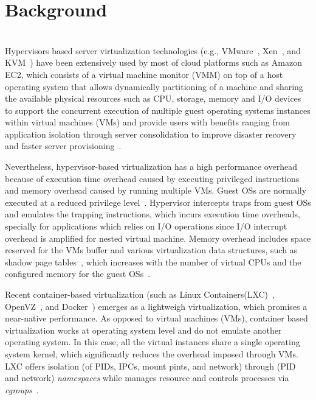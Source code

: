 
\section{Background}

\\

Hypervisors based server virtualization technologies (e.g., VMware~\cite{xxx}, Xen~\cite{xxx}, and KVM~\cite{xxx}) have been extensively used by most of cloud platforms such as Amazon EC2, which consists of a virtual machine monitor (VMM) on top of a host operating system that allows dynamically partitioning of a machine and sharing the available physical resources such as CPU, storage, memory and I/O devices to support the concurrent execution of multiple guest operating systems instances within virtual machines (VMs) and provide users with benefits ranging from application isolation through server consolidation to improve disaster recovery and faster server provisioning~\cite{xxx}.

Nevertheless, hypervisor-based virtualization has a high performance overhead because of execution time overhead caused by executing privileged instructions and memory overhead caused by running multiple VMs. Guest OSs are normally executed at a reduced privilege level~\cite{}. Hypervisor intercepts traps from guest OSs and emulates the trapping instructions, which incurs execution time overheads, specially for applications which relies on I/O operations since I/O interrupt overhead is amplified for nested virtual machine. Memory overhead includes space reserved for the VMs buffer and various virtualization data structures, such as shadow page tables~\cite{}, which increases with the number of virtual CPUs and the configured memory for the guest OSs~\cite{}. 

Recent container-based virtualization (such as Linux Containers(LXC)~\cite{xxx}, OpenVZ~\cite{bibid}, and Docker~\cite{}) emerges as a lightweigh virtualization, which promises a near-native performance. As opposed to virtual machines (VMs), container based virtualization works at operating system level and do not emulate another operating system. In this case, all the virtual instances share a single operating system kernel, which significantly reduces the overhead imposed through VMs. LXC offers isolation (of PIDs, IPCs, mount pints, and network) through (PID and network) \textit{namespaces} while manages resource and controls processes via \textit{cgroups}~\cite{}. 

